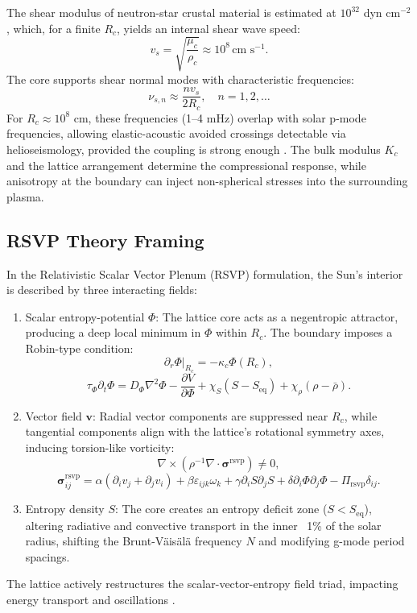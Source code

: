 \documentclass{article}
\begin{document}
The shear modulus of neutron-star crustal material is estimated at $10^{32}$ dyn cm$^{-2}$, which, for a finite $R_c$, yields an internal shear wave speed:
\[
v_s = \sqrt{\frac{\mu_c}{\rho_c}} \approx 10^8 \, \text{cm s}^{-1}.
\]
The core supports shear normal modes with characteristic frequencies:
\[
\nu_{s,n} \approx \frac{n v_s}{2 R_c}, \quad n = 1, 2, \dots
\]
For $R_c \approx 10^8$ cm, these frequencies (1--4 mHz) overlap with solar p-mode frequencies, allowing elastic-acoustic avoided crossings detectable via helioseismology, provided the coupling is strong enough \citep{aerts2010}. The bulk modulus $K_c$ and the lattice arrangement determine the compressional response, while anisotropy at the boundary can inject non-spherical stresses into the surrounding plasma.

\subsection{RSVP Theory Framing}

In the Relativistic Scalar Vector Plenum (RSVP) formulation, the Sun’s interior is described by three interacting fields:
\begin{enumerate}
\item Scalar entropy-potential $\Phi$: The lattice core acts as a negentropic attractor, producing a deep local minimum in $\Phi$ within $R_c$. The boundary imposes a Robin-type condition:
\[
\partial_r \Phi \big|_{R_c} = -\kappa_c \Phi(R_c),
\]
\[
\tau_\Phi \partial_t \Phi = D_\Phi \nabla^2 \Phi - \frac{\partial V}{\partial \Phi} + \chi_S (S - S_{\text{eq}}) + \chi_\rho (\rho - \bar{\rho}).
\]
\item Vector field $\mathbf{v}$: Radial vector components are suppressed near $R_c$, while tangential components align with the lattice’s rotational symmetry axes, inducing torsion-like vorticity:
\[
\nabla \times \left( \rho^{-1} \nabla \cdot \boldsymbol{\sigma}^{\text{rsvp}} \right) \neq 0,
\]
\[
\boldsymbol{\sigma}^{\text{rsvp}}_{ij} = \alpha (\partial_i v_j + \partial_j v_i) + \beta \varepsilon_{ijk} \omega_k + \gamma \partial_i S \partial_j S + \delta \partial_i \Phi \partial_j \Phi - \Pi_{\text{rsvp}} \delta_{ij}.
\]
\item Entropy density $S$: The core creates an entropy deficit zone ($S < S_{\text{eq}}$), altering radiative and convective transport in the inner ~1\% of the solar radius, shifting the Brunt-Väisälä frequency $N$ and modifying g-mode period spacings.
\end{enumerate}
The lattice actively restructures the scalar-vector-entropy field triad, impacting energy transport and oscillations \citep{markovic1995, kunitomo2022}.
\end{document}
